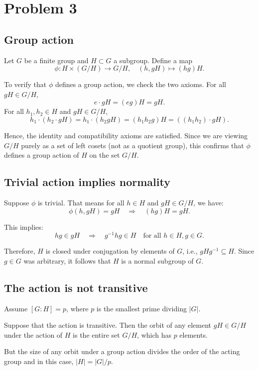 \documentclass[12pt]{article}
\begin{document}
\section*{Problem 3}
\subsection*{Group action}

Let \( G \) be a finite group and \( H \subset G \) a subgroup. Define a map
\[
\phi  : H \times (G/H) \to G/H, \quad (h, gH) \mapsto (hg)H.
\]

To verify that \( \phi \) defines a group action, we check the two axioms. For all \( gH \in G/H \), 
\[e \cdot gH = (eg)H = gH.\]
For all \( h_1, h_2 \in H \) and \( gH \in G/H \), 
\[h_1 \cdot (h_2 \cdot gH) = h_1 \cdot (h_2 g H) = (h_1 h_2 g)H = ((h_1 h_2) \cdot gH).\]

Hence, the identity and compatibility axioms are satisfied. Since we are viewing \( G/H \) purely as a set of left cosets (not as a quotient group), this confirms that \( \phi \) defines a group action of \( H \) on the set \( G/H \).

\subsection*{Trivial action implies normality}

Suppose $\phi$ is trivial. That means for all \( h \in H \) and \( gH \in G/H \), we have:
\[
\phi(h, gH) = gH \quad \Rightarrow \quad (hg)H = gH.
\]

This implies:
\[
hg \in gH \quad \Rightarrow \quad g^{-1} h g \in H \quad \text{for all } h \in H, g \in G.
\]

Therefore, \( H \) is closed under conjugation by elements of \( G \), i.e., \( gHg^{-1} \subseteq H \). Since \( g \in G \) was arbitrary, it follows that \(H\) is a normal subgroup of \(G\).

\subsection*{The action is not transitive}

Assume \( [G : H] = p \), where \( p \) is the smallest prime dividing \( |G| \).

Suppose that the action is transitive. Then the orbit of any element \( gH \in G/H \) under the action of \( H \) is the entire set \( G/H \), which has \( p \) elements.

But the size of any orbit under a group action divides the order of the acting group and in this case, \( |H| = |G|/p \).
\end{document}
